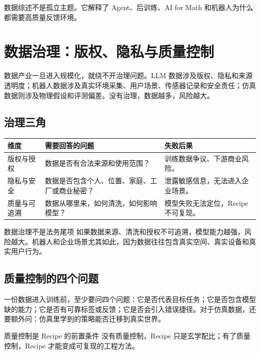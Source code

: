 \documentclass[a4paper]{article}
\begin{document}
数据综述不是孤立主题。它解释了 Agent、后训练、AI for Math 和机器人为什么都需要高质量反馈环境。


\section{数据治理：版权、隐私与质量控制}

数据产业一旦进入规模化，就绕不开治理问题。LLM 数据涉及版权、隐私和来源透明度；机器人数据涉及真实环境采集、用户场景、传感器记录和安全责任；仿真数据则涉及物理假设和评测偏差。没有治理，数据越多，风险越大。

\subsection{治理三角}

\noindent\begin{longtable}{p{}p{}p{}}
\toprule
维度 & 需要回答的问题 & 失败后果 \\
\midrule
版权与授权 & 数据是否有合法来源和使用范围？ & 训练数据争议、下游商业风险。 \\
隐私与安全 & 数据是否包含个人、位置、家庭、工厂或商业秘密？ & 泄露敏感信息，无法进入企业场景。 \\
质量与可追溯 & 数据从哪里来，如何清洗，如何影响模型？ & 模型失败无法定位，Recipe 不可复现。 \\
\bottomrule
\end{longtable}

\begin{warningbox}{数据治理不是法务尾项}
如果数据来源、清洗和授权不可追溯，模型能力越强，风险越大。机器人和企业场景尤其如此，因为数据往往包含真实空间、真实设备和真实用户行为。
\end{warningbox}

\subsection{质量控制的四个问题}

一份数据进入训练前，至少要问四个问题：它是否代表目标任务；它是否包含模型缺的能力；它是否有可靠标签或反馈；它是否会引入错误捷径。对于仿真数据，还要额外问：仿真里学到的策略能否迁移到真实世界。

\begin{importantbox}{质量控制是 Recipe 的前置条件}
没有质量控制，Recipe 只是玄学配比；有了质量控制，Recipe 才能变成可复现的工程方法。
\end{importantbox}
\end{document}
